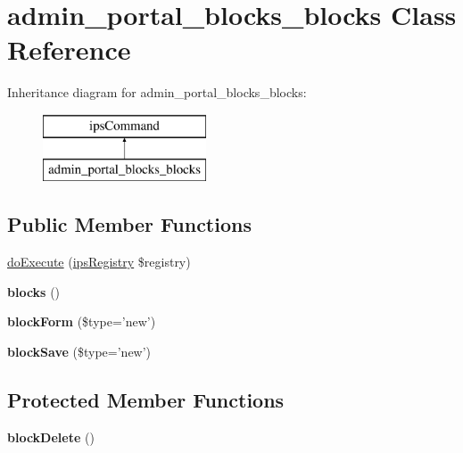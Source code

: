 \hypertarget{classadmin__portal__blocks__blocks}{\section{admin\-\_\-portal\-\_\-blocks\-\_\-blocks Class Reference}
\label{classadmin__portal__blocks__blocks}
}
Inheritance diagram for admin\-\_\-portal\-\_\-blocks\-\_\-blocks\-:\begin{figure}[H]
\begin{center}
\leavevmode
\includegraphics[height=2.000000cm]{classadmin__portal__blocks__blocks}
\end{center}
\end{figure}
\subsection*{Public Member Functions}
\begin{DoxyCompactItemize}
\item 
\hyperlink{classadmin__portal__blocks__blocks_afbc4e912a0604b94d47d66744c64d8ba}{do\-Execute} (\hyperlink{classips_registry}{ips\-Registry} \$registry)
\item 
\hypertarget{classadmin__portal__blocks__blocks_a76ba68d3fcc64af35ee3cef365a2d1e3}{{\bfseries blocks} ()}\label{classadmin__portal__blocks__blocks_a76ba68d3fcc64af35ee3cef365a2d1e3}

\item 
\hypertarget{classadmin__portal__blocks__blocks_ac96f6c81d664b4414c3177f2ab1d93ae}{{\bfseries block\-Form} (\$type='new')}\label{classadmin__portal__blocks__blocks_ac96f6c81d664b4414c3177f2ab1d93ae}

\item 
\hypertarget{classadmin__portal__blocks__blocks_a78a71ce4bd609c6eafb29d5d3e1f78c2}{{\bfseries block\-Save} (\$type='new')}\label{classadmin__portal__blocks__blocks_a78a71ce4bd609c6eafb29d5d3e1f78c2}

\end{DoxyCompactItemize}
\subsection*{Protected Member Functions}
\begin{DoxyCompactItemize}
\item 
\hypertarget{classadmin__portal__blocks__blocks_ae1ef8c77249abd211de620a0aba1215c}{{\bfseries block\-Delete} ()}\label{classadmin__portal__blocks__blocks_ae1ef8c77249abd211de620a0aba1215c}

\end{DoxyCompactItemize}
